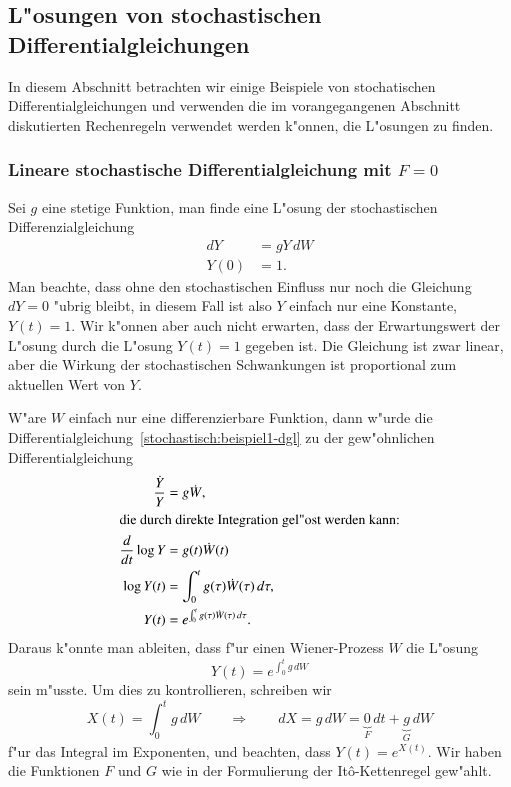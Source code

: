 %
%
\subsection{L"osungen von stochastischen Differentialgleichungen}
In diesem Abschnitt betrachten wir einige Beispiele von stochatischen
Differentialgleichungen und verwenden die im vorangegangenen Abschnitt
diskutierten Rechenregeln verwendet werden k"onnen, die L"osungen
zu finden.

\subsubsection{Lineare stochastische Differentialgleichung mit $F=0$}
Sei $g$ eine stetige Funktion, man finde eine L"osung der
stochastischen Differenzialgleichung
\begin{equation}
\begin{aligned}
dY&=gY\,dW\\
Y(0)&=1.
\end{aligned}
\label{stochastisch:beispiel1-dgl}
\end{equation}
Man beachte, dass ohne den stochastischen Einfluss nur noch die Gleichung
$dY=0$ "ubrig bleibt, in diesem Fall ist also $Y$ einfach nur eine
Konstante, $Y(t)=1$.
Wir k"onnen aber auch nicht erwarten, dass der Erwartungswert der
L"osung durch die L"osung $Y(t)=1$ gegeben ist.
Die Gleichung ist zwar linear, aber die Wirkung der stochastischen
Schwankungen ist proportional zum aktuellen Wert von $Y$.

W"are $W$ einfach nur eine differenzierbare Funktion, dann w"urde die
Differentialgleichung~\eqref{stochastisch:beispiel1-dgl} zu der
gew"ohnlichen Differentialgleichung
\begin{align*}
\frac{\dot Y}{Y} &= g\dot W,
\\
\intertext{die durch direkte Integration gel"ost werden kann:}
\frac{d}{dt}\log Y&= g(t) \dot W(t)
\\
\log Y(t)&=\int_0^t g(\tau)\dot W(\tau)\,d\tau,
\\
Y(t)&=e^{\int_0^t g(\tau)\dot W(\tau)\,d\tau}.
\end{align*}
Daraus k"onnte man ableiten, dass f"ur einen Wiener-Prozess $W$ die L"osung
\[
Y(t)=e^{\int_0^t g\,dW}
\]
sein m"usste.
Um dies zu kontrollieren, schreiben wir 
\[
X(t)=\int_0^t g\,dW
\qquad\Rightarrow\qquad
dX = g\,dW = \underbrace{0}_{\textstyle F}\,dt
+
\underbrace{g}_{\textstyle G}\,dW
\]
f"ur das Integral im Exponenten, und beachten, dass $Y(t)=e^{X(t)}$.
Wir haben die Funktionen $F$ und $G$ wie in der Formulierung der
It\^o-Kettenregel gew"ahlt.

